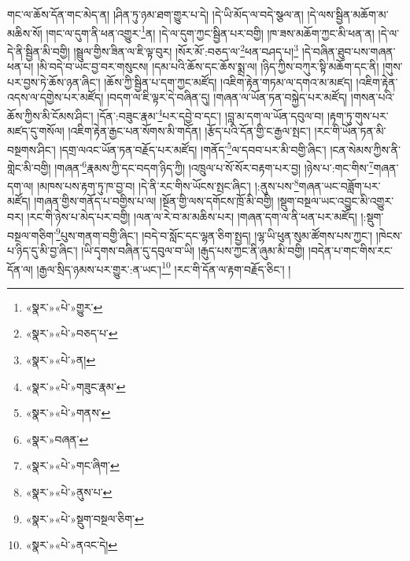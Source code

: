 \documentclass[12pt,a4paper]{book}
\begin{document}
གང་ལ་ཆོས་དོན་གང་མེད་ན། །ཤིན་ཏུ་ཉམ་ཐག་གྱུར་པ་དེ། །དེ་ཡི་མོད་ལ་བདེ་སྩལ་ན། །དེ་ལས་སྦྱིན་མཆོག་མ་མཆིས་སོ། །གང་ལ་དུག་ནི་ཕན་འགྱུར་\footnote{«སྣར་»«པེ་»གྱུར་}ན། །དེ་ལ་དུག་ཀྱང་སྦྱིན་པར་བགྱི། །ཁ་ཟས་མཆོག་ཀྱང་མི་ཕན་ན། །དེ་ལ་དེ་ནི་སྦྱིན་མི་བགྱི། །སྦྲུལ་གྱིས་ཟིན་ལ་ཇི་ལྟ་བུར། །སོར་མོ་:བཅད་ལ་\footnote{«སྣར་»«པེ་»བཅད་པ་}ཕན་བཤད་པ།\footnote{«སྣར་»«པེ་»ན།} །དེ་བཞིན་ཐུབ་པས་གཞན་ཕན་པ། །མི་བདེ་བ་ཡང་བྱ་བར་གསུངས། །དམ་པའི་ཆོས་དང་ཆོས་སྨྲ་ལ། །ཉིད་ཀྱིས་བཀུར་སྟི་མཆོག་དང་ནི། །གུས་པར་བྱས་ཏེ་ཆོས་ཉན་ཞིང་། །ཆོས་ཀྱི་སྦྱིན་པ་དག་ཀྱང་མཛོད། །འཇིག་རྟེན་གཏམ་ལ་དགའ་མ་མཛད། །འཇིག་རྟེན་འདས་ལ་དགྱེས་པར་མཛོད། །བདག་ལ་ཇི་ལྟར་དེ་བཞིན་དུ། །གཞན་ལ་ཡོན་ཏན་བསྐྱེད་པར་མཛོད། །གསན་པའི་ཆོས་ཀྱིས་མི་ངོམས་ཤིང་། །དོན་:བཟུང་རྣམ་\footnote{«སྣར་»«པེ་»གཟུང་རྣམ་}པར་དབྱེ་བ་དང་། །བླ་མ་དག་ལ་ཡོན་དབུལ་བ། །རྟག་ཏུ་གུས་པར་མཛད་དུ་གསོལ། །འཇིག་རྟེན་རྒྱང་པན་སོགས་མི་གདོན། །རྩོད་པའི་དོན་གྱི་ང་རྒྱལ་སྤང་། །རང་གི་ཡོན་ཏན་མི་བསྔགས་ཤིང་། །དགྲ་ལའང་ཡོན་ཏན་བརྗོད་པར་མཛོད། །གནོད་\footnote{«སྣར་»«པེ་»གནས་}ལ་དབབ་པར་མི་བགྱི་ཞིང་། །ངན་སེམས་ཀྱིས་ནི་གླེང་མི་བགྱི། །གཞན་\footnote{«སྣར་»བཞན་}རྣམས་ཀྱི་དང་བདག་ཉིད་ཀྱི། །འཁྲུལ་པ་སོ་སོར་བརྟག་པར་བྱ། །ཉེས་པ་:གང་གིས་\footnote{«སྣར་»«པེ་»གང་ཞིག་}གཞན་དག་ལ། །མཁས་པས་རྟག་ཏུ་ཁ་བྱ་བ། །དེ་ནི་རང་གིས་ཡོངས་སྤང་ཞིང་། །:ནུས་པས་\footnote{«སྣར་»«པེ་»ནུས་པ་}གཞན་ཡང་བཟློག་པར་མཛོད། །གཞན་གྱིས་གནོད་པ་བགྱིས་པ་ལ། །སྔོན་གྱི་ལས་དགོངས་ཁྲོ་མི་བགྱི། །སྡུག་བསྔལ་ཡང་འབྱུང་མི་འགྱུར་བར། །རང་གི་ཉེས་པ་མེད་པར་བགྱི། །ལན་ལ་རེ་བ་མ་མཆིས་པར། །གཞན་དག་ལ་ནི་ཕན་པར་མཛོད། །:སྡུག་བསྔལ་གཅིག་\footnote{«སྣར་»«པེ་»སྡུག་བསྔལ་ཅིག་}པུས་གནག་བགྱི་ཞིང་། །བདེ་བ་སློང་དང་ལྷན་ཅིག་སྤྱད། །ལྷ་ཡི་ཕུན་སུམ་ཚོགས་པས་ཀྱང་། །ཁེངས་པ་ཉིད་དུ་མི་བྱ་ཞིང་། །ཡི་དྭགས་བཞིན་དུ་དབུལ་བ་ཡི། །རྒུད་པས་ཀྱང་ནི་ཞུམ་མི་བགྱི། །བདེན་པ་གང་གིས་རང་དོན་ལ། །རྒྱལ་སྲིད་ཉམས་པར་གྱུར་:ན་ཡང་།\footnote{«སྣར་»«པེ་»ནའང་དེ།} །རང་གི་དོན་ལ་རྟག་བརྗོད་ཅིང་། །
\end{document}
